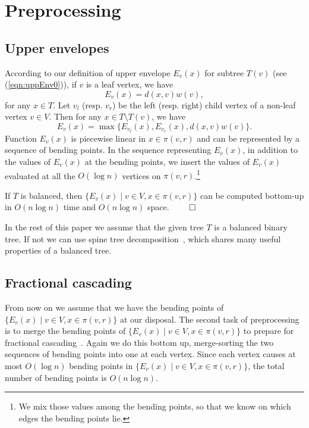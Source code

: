 \documentclass{llncs}
\newcommand{\QED}{\hfill$\qed$}
\begin{document}
{\section{Preprocessing}\label{sec:preproc}

\subsection{Upper envelopes}
According to our definition of upper envelope $E_v(x)$ for subtree $T(v)$ (see (\ref{eqn:uppEnv0})),
if $v$ is a leaf vertex, we have
\begin{equation}\label{eqn:uppEnv1}
E_v(x) = d(x,v)w(v),
\end{equation}
for any $x \in T$.
Let $v_l$ (resp. $v_r$) be the left (resp. right) child vertex of a non-leaf vertex $v\in V$.
Then for any $x\in T\setminus T(v)$, we have
\begin{equation}\label{eqn:uppEnv2}
E_v(x) = \max\{E_{v_l}(x),E_{v_r}(x),d(x,v)w(v)\}.
\end{equation}
Function $E_v(x)$ is piecewise linear in $x\in \pi(v,r)$ and can be represented by a sequence of
bending points.
In the sequence representing $E_v(x)$,
in addition to the values of $E_v(x)$ at the bending points,
we insert the values of $E_v(x)$ evaluated at all the $O(\log n)$ vertices on $\pi(v,r)$.\footnote{We mix
those values among the bending points,
so that we know on which edges the bending points lie.}
\begin{lemma}\label{lem:envelope}
If $T$ is balanced, then 
$\{E_v(x) \mid v\in V, x\in \pi(v,r)\}$ can be computed bottom-up in $O(n\log n)$ time
and $O(n \log n)$ space.
\QED
\end{lemma}

In the rest of this paper we assume that the given tree $T$ is a balanced binary tree.
If not we can use spine tree decomposition~\cite{benkoczi2004,benkoczi2003,bhattacharya2012b},
which shares many useful properties of a balanced tree.



\subsection{Fractional cascading}\label{sec:fractional}

From now on we assume that we have the bending points of
$\{E_v(x)\mid v \in V,x\in \pi(v,r)\}$ at our disposal.
The second task of preprocessing is to merge the bending points of $\{E_v(x)\mid v \in V, x\in \pi(v,r)\}$
to prepare for fractional cascading~\cite{chazelle1986a}.
Again we do this bottom up, 
merge-sorting the two sequences of bending points into one at each vertex.
Since each vertex causes at most $O(\log n)$ bending points in $\{E_v(x)\mid v \in V, x\in \pi(v,r)\}$,
the total number of bending points is $O(n \log n)$.


}
\end{document}
